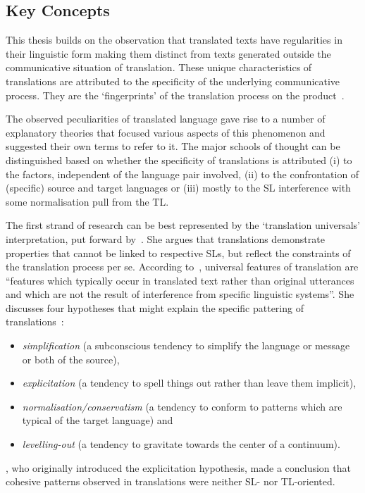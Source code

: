 \subsection{\label{ssec:keyterms}Key Concepts}
This thesis builds on the observation that translated texts have regularities in their linguistic form making them distinct from texts generated outside the communicative situation of translation. These unique characteristics of translations are attributed to the specificity of the underlying communicative process. They are the `fingerprints' of the translation process on the product~\cite{Gellerstam1986}.

\label{pg:three_strands_in_translationese_studies}
The observed peculiarities of translated language gave rise to a number of explanatory theories that focused various aspects of this phenomenon and suggested their own terms to refer to it. The major schools of thought can be distinguished based on whether the specificity of translations is attributed (i) to the factors, independent of the language pair involved, (ii) to the confrontation of (specific) source and target languages or (iii) mostly to the SL interference with some normalisation pull from the TL. 

The first strand of research can be best represented by the `translation universals' interpretation, put forward by~\citet{Baker1993}. She argues that translations demonstrate properties that cannot be linked to respective SLs, but reflect the constraints of the translation process per se. According to~\citet[p.243]{Baker1993}, universal features of translation are ``features which typically occur in translated text rather than original utterances and which are not the result of interference from specific linguistic systems''. She discusses four hypotheses that might explain the specific pattering of translations~\cite[pp.176--177, 183--184]{Baker1996}: 
\label{pg:major_trends}
\begin{itemize}\compresslist{}
	\item \textit{simplification} (a subconscious tendency to simplify the language or message or both of the source),
	\item \textit{explicitation} (a tendency to spell things out rather than leave them implicit), 
	\item \textit{normalisation/conservatism} (a tendency to conform to patterns which are typical of the target language) and
	\item \textit{levelling-out} (a tendency to gravitate towards the center of a continuum). 
\end{itemize}
\citet{BlumKulka1986}, who originally introduced the explicitation hypothesis, made a conclusion that cohesive patterns observed in translations were neither SL- nor TL-oriented. 


